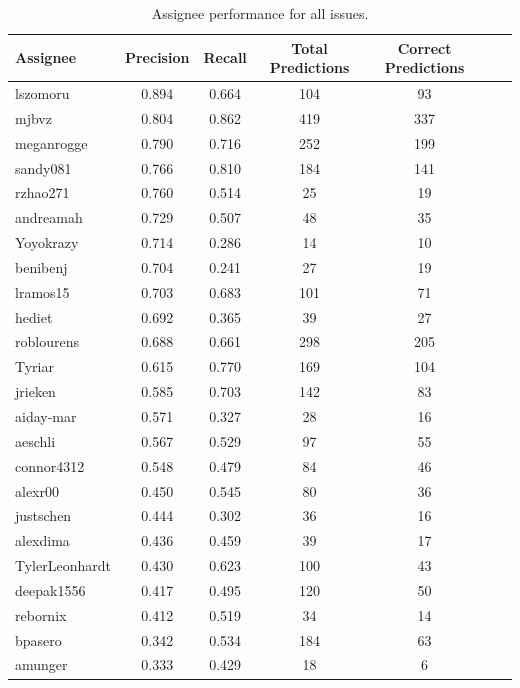 \documentclass[tikz,10pt,fleqn]{article}
\begin{document}
\begin{table}[H]
    \centering
    \caption{Assignee performance for all issues.}
    \begin{tabular}{@{}lcccccc@{}}
        \toprule
        Assignee & Precision & Recall & Total Predictions & Correct Predictions \\ \midrule
        lszomoru       & 0.894  & 0.664  & 104 & 93  \\
        mjbvz          & 0.804  & 0.862  & 419 & 337 \\
        meganrogge     & 0.790  & 0.716  & 252 & 199 \\
        sandy081       & 0.766  & 0.810  & 184 & 141 \\
        rzhao271       & 0.760  & 0.514  & 25  & 19  \\
        andreamah      & 0.729  & 0.507  & 48  & 35  \\
        Yoyokrazy      & 0.714  & 0.286  & 14  & 10  \\
        benibenj       & 0.704  & 0.241  & 27  & 19  \\
        lramos15       & 0.703  & 0.683  & 101 & 71  \\
        hediet         & 0.692  & 0.365  & 39  & 27  \\
        roblourens     & 0.688  & 0.661  & 298 & 205 \\
        Tyriar         & 0.615  & 0.770  & 169 & 104 \\
        jrieken        & 0.585  & 0.703  & 142 & 83  \\
        aiday-mar      & 0.571  & 0.327  & 28  & 16  \\
        aeschli        & 0.567  & 0.529  & 97  & 55  \\
        connor4312     & 0.548  & 0.479  & 84  & 46  \\
        alexr00        & 0.450  & 0.545  & 80  & 36  \\
        justschen      & 0.444  & 0.302  & 36  & 16  \\
        alexdima       & 0.436  & 0.459  & 39  & 17  \\
        TylerLeonhardt & 0.430  & 0.623  & 100 & 43  \\
        deepak1556     & 0.417  & 0.495  & 120 & 50  \\
        rebornix       & 0.412  & 0.519  & 34  & 14  \\
        bpasero        & 0.342  & 0.534  & 184 & 63  \\
        amunger        & 0.333  & 0.429  & 18  & 6   \\

\end{tabular}
\end{table}
\end{document}
